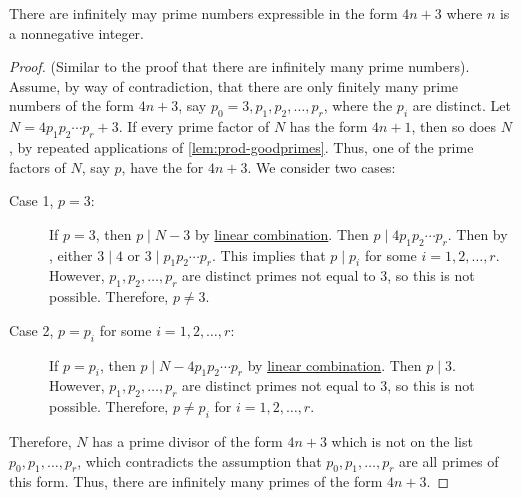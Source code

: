 \documentclass{ximera}
\begin{document}
\begin{proposition}\label{prop:inf-badprimes}
    There are infinitely may prime numbers expressible in the form $4n+3$ where $n$ is a nonnegative integer.
    \begin{proof}
        (Similar to the proof that there are infinitely many prime numbers). Assume, by way of contradiction, that there are only finitely many prime numbers of the form $4n+3$, say $p_0=3, p_1,p_2,\dots, p_r$, where the $p_i$ are distinct. Let $N=4p_1 p_2 \cdots p_r+3$. If every prime factor of $N$ has the form $4n+1$, then so does $N$, by repeated applications of \cref{lem:prod-goodprimes}. Thus, one of the prime factors of $N$, say $p$, have the for $4n+3$. We consider two cases:
        
        \begin{description}
        \item[Case 1, $p=3$:] If $p=3$, then $p\mid N-3$ by \hyperref[lem:linear-combo]{linear combination}. Then $p\mid 4 p_1p_2\cdots p_r$. Then by , either $3\mid 4$ or $3\mid p_1p_2\cdots p_r$. This implies that $p\mid p_i$ for some $i=1,2,\dots,r$. However, $p_1,p_2,\dots,p_r$ are distinct primes not equal to $3$, so this is not possible. Therefore, $p\neq 3$.
        
        \item[Case 2, $p=p_i$ for some $i=1,2,\dots, r$:] If $p=p_i$, then $p\mid N-4p_1p_2\cdots p_r$ by \hyperref[lem:linear-combo]{linear combination}. Then $p\mid 3$. However, $p_1,p_2,\dots,p_r$ are distinct primes not equal to $3$, so this is not possible. Therefore, $p\neq p_i$ for $i=1,2,\dots,r$.
        \end{description}
        Therefore, $N$ has a prime divisor of the form $4n+3$ which is not on the list $p_0,p_1,\dots,p_r$, which contradicts the assumption that $p_0,p_1,\dots,p_r$ are all primes of this form. Thus, there are infinitely many primes of the form $4n+3$.
    \end{proof}
\end{proposition}
\end{document}
